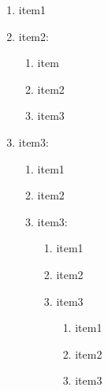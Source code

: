 \documentclass{report}
\begin{document}
    \begin{enumerate}
        \item item1
        \item item2:
            \begin{enumerate}
                \item item
                \item item2 
                \item item3 
            \end{enumerate}  
        \item item3:
            \begin{enumerate}
                \item item1
                \item item2 
                \item item3: 
                    \begin{enumerate}
                        \item item1
                        \item item2 
                        \item item3 
                            \begin{enumerate}
                                \item item1
                                \item item2 
                                \item item3 
                            \end{enumerate} 
                    \end{enumerate} 
            \end{enumerate} 
    \end{enumerate}




\end{document}

